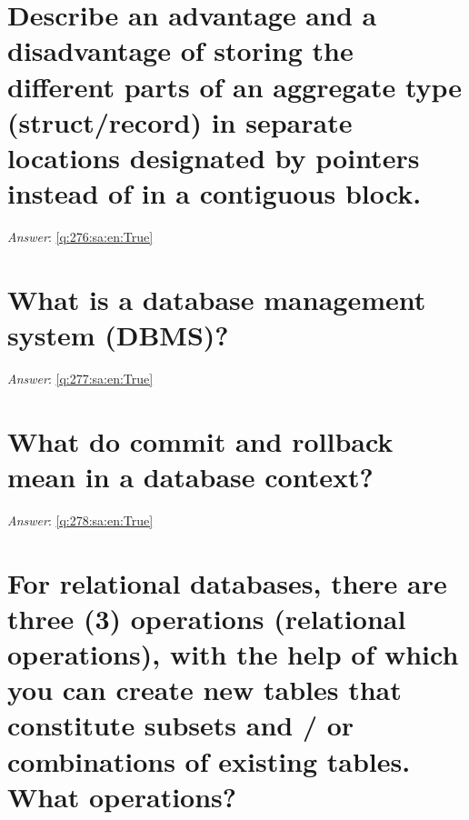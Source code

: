 \documentclass[a4paper,11pt,oneside]{book}
\begin{document}
\begin{sloppypar}
\section{Describe an advantage and a disadvantage of storing the different parts of an aggregate type (struct/record) in separate locations designated by pointers instead of in a contiguous block.}

\label{q:276:sa:en:False}

\vspace{2cm}

\noindent\makebox[\textwidth]{\hrulefill}

\vspace{1cm}

\textit{Answer}: \autoref{q:276:sa:en:True}



\section{What is a database management system (DBMS)?}

\label{q:277:sa:en:False}

\vspace{2cm}

\noindent\makebox[\textwidth]{\hrulefill}

\vspace{1cm}

\textit{Answer}: \autoref{q:277:sa:en:True}



\section{What do commit and rollback mean in a database context?}

\label{q:278:sa:en:False}

\vspace{2cm}

\noindent\makebox[\textwidth]{\hrulefill}

\vspace{1cm}

\textit{Answer}: \autoref{q:278:sa:en:True}



\section{For relational databases, there are three (3) operations (relational operations), with the help of which you can create new tables that constitute subsets and / or combinations of existing tables. What operations?}


\end{sloppypar}
\end{document}
